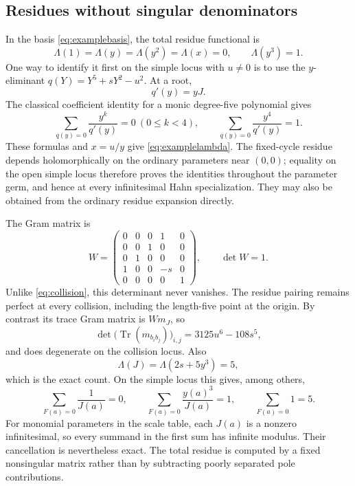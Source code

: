 \documentclass[11pt]{article}
\theoremstyle{definition}
\newcommand{\Tr}{\operatorname{Tr}}
\begin{document}
\subsection{Residues without singular denominators}
In the basis \eqref{eq:examplebasis}, the total residue functional is
\begin{equation}\label{eq:examplelambda}
 \Lambda(1)=\Lambda(y)=\Lambda(y^2)=\Lambda(x)=0,
 \qquad \Lambda(y^3)=1.
\end{equation}
One way to identify it first on the simple locus with $u\ne0$ is to use the $y$-eliminant $q(Y)=Y^5+sY^2-u^2$. At a root,
\[
 q'(y)=yJ.
\]
The classical coefficient identity for a monic degree-five polynomial gives
\[
 \sum_{q(y)=0}\frac{y^k}{q'(y)}=0\ (0\le k<4),
 \qquad \sum_{q(y)=0}\frac{y^4}{q'(y)}=1.
\]
These formulas and $x=u/y$ give \eqref{eq:examplelambda}. The fixed-cycle residue depends holomorphically on the ordinary parameters near $(0,0)$; equality on the open simple locus therefore proves the identities throughout the parameter germ, and hence at every infinitesimal Hahn specialization. They may also be obtained from the ordinary residue expansion directly.

The Gram matrix is
\begin{equation}\label{eq:exampleGram}
 W=\begin{pmatrix}
 0&0&0&1&0\\
 0&0&1&0&0\\
 0&1&0&0&0\\
 1&0&0&-s&0\\
 0&0&0&0&1
 \end{pmatrix},\qquad \det W=1.
\end{equation}
Unlike \eqref{eq:collision}, this determinant never vanishes. The residue pairing remains perfect at every collision, including the length-five point at the origin. By contrast its trace Gram matrix is $Wm_J$, so
\[
 \det\bigl(\Tr(m_{b_ib_j})\bigr)_{i,j}=3125u^6-108s^5,
\]
and does degenerate on the collision locus. Also
\[
 \Lambda(J)=\Lambda(2s+5y^3)=5,
\]
which is the exact count. On the simple locus this gives, among others,
\begin{equation}\label{eq:examplecancellation}
 \sum_{F(a)=0}\frac1{J(a)}=0,
 \qquad
 \sum_{F(a)=0}\frac{y(a)^3}{J(a)}=1,
 \qquad
 \sum_{F(a)=0}1=5.
\end{equation}
For monomial parameters in the scale table, each $J(a)$ is a nonzero infinitesimal, so every summand in the first sum has infinite modulus. Their cancellation is nevertheless exact. The total residue is computed by a fixed nonsingular matrix rather than by subtracting poorly separated pole contributions.
\end{document}
